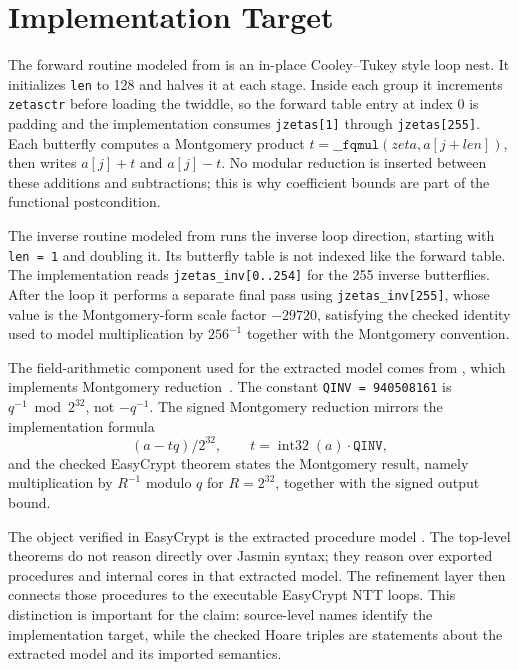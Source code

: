 \documentclass[10pt,twocolumn]{article}
\newcommand{\ec}{EasyCrypt}
\newcommand{\jasmin}{Jasmin}
\begin{document}
\section{Implementation Target}

The forward routine modeled from  is an in-place Cooley--Tukey
style loop nest. It initializes \texttt{len} to 128 and halves it at each stage.
Inside each group it increments \texttt{zetasctr} before loading the twiddle, so
the forward table entry at index 0 is padding and the implementation consumes
\texttt{jzetas[1]} through \texttt{jzetas[255]}. Each butterfly computes a
Montgomery product \(t=\texttt{\_\_fqmul}(zeta, a[j+len])\), then writes
\(a[j]+t\) and \(a[j]-t\). No modular reduction is inserted between these
additions and subtractions; this is why coefficient bounds are part of the
functional postcondition.

The inverse routine modeled from  runs the inverse loop
direction, starting with \texttt{len = 1} and doubling it. Its butterfly table is
not indexed like the forward table. The implementation reads
\texttt{jzetas\_inv[0..254]} for the 255 inverse butterflies. After the loop it
performs a separate final pass using
\texttt{jzetas\_inv[255]}, whose value is the Montgomery-form scale factor
\(-29720\), satisfying the checked identity used to model multiplication by
\(256^{-1}\) together with the Montgomery convention.

The field-arithmetic component used for the extracted model comes from
, which implements Montgomery
reduction~\cite{Montgomery1985}. The constant
\texttt{QINV = 940508161} is \(q^{-1} \bmod 2^{32}\), not \(-q^{-1}\). The
signed Montgomery reduction mirrors the implementation formula
\[
  (a - t q) / 2^{32}, \qquad
  t = \operatorname{int32}(a)\cdot \texttt{QINV},
\]
and the checked \ec{} theorem states the Montgomery result, namely multiplication
by \(R^{-1}\) modulo \(q\) for \(R=2^{32}\), together with the signed output
bound.

The object verified in \ec{} is the extracted procedure model
. The top-level theorems do not reason directly over
\jasmin{} syntax; they reason over exported procedures and internal cores in
that extracted model. The refinement layer then connects those procedures to
the executable \ec{} NTT loops. This distinction is important for the claim:
source-level names identify the implementation target, while the checked Hoare
triples are statements about the extracted model and its imported semantics.
\end{document}
